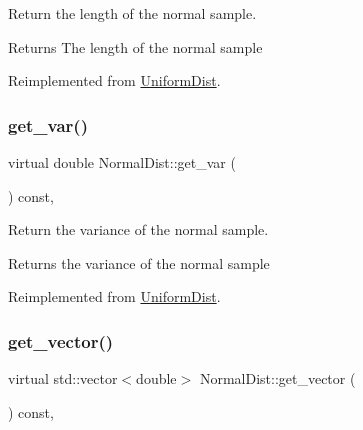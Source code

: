 Return the length of the normal sample. 

\begin{DoxyReturn}{Returns}
The length of the normal sample 
\end{DoxyReturn}


Reimplemented from \hyperlink{classUniformDist_a6e7a871053b2eb563fcbf2f7e02fb22b}{Uniform\+Dist}.

\mbox{\label{classNormalDist_a46bc646f126ac3c2d46bcd9ccbf01135}} 
\subsubsection{\texorpdfstring{get\+\_\+var()}{get\_var()}}
{\footnotesize\ttfamily virtual double Normal\+Dist\+::get\+\_\+var (\begin{DoxyParamCaption}{ }\end{DoxyParamCaption}) const\hspace{0.3cm}{\ttfamily [inline]}, {\ttfamily [virtual]}}



Return the variance of the normal sample. 

\begin{DoxyReturn}{Returns}
the variance of the normal sample 
\end{DoxyReturn}


Reimplemented from \hyperlink{classUniformDist_aade143a6ff9ed9a8bee2e6b9fb2fed4c}{Uniform\+Dist}.

\mbox{\label{classNormalDist_a473e67b9d1787f6ff887f6854dbd350c}} 
\subsubsection{\texorpdfstring{get\+\_\+vector()}{get\_vector()}}
{\footnotesize\ttfamily virtual std\+::vector$<$double$>$ Normal\+Dist\+::get\+\_\+vector (\begin{DoxyParamCaption}{ }\end{DoxyParamCaption}) const\hspace{0.3cm}{\ttfamily [inline]}, {\ttfamily [virtual]}}



